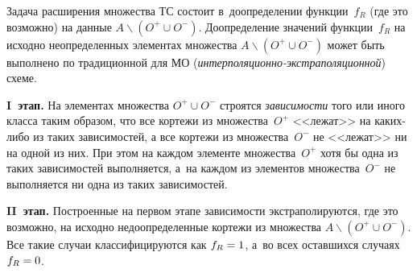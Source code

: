 \begin{multicols}{2}
  
 
  
  Задача расширения множества ТС состоит в~доопределении функции~$f_R$ 
(где это возможно) на данные $A\backslash (O^+\cup O^-)$. Доопределение 
значений функции~$f_R$ на исходно неопределенных элементах множества 
$A\backslash (O^+\cup O^-)$ может быть выполнено по традиционной для МО  
(\textit{ин\-тер\-по\-ля\-ци\-он\-но-экстра\-по\-ля\-ци\-он\-ной}) схеме.
  
  \textbf{I~этап.} На элементах множества $O^+\cup O^-$ 
строятся \textit{зависимости} того или иного класса таким образом, что все 
кортежи из множества~$O^+$ <<лежат>> на ка\-ких-ли\-бо из таких 
зависимостей, а все кортежи из множества~$O^-$ не <<лежат>> ни на одной из 
них. При этом на каждом элементе множества~$O^+$ хотя бы одна из таких 
зависимостей выполняется, а~на каж\-дом из элементов множества~$O^-$ не 
выполняется ни одна из таких зависимостей.
  
  \textbf{II~этап.} Построенные на первом этапе зависимости 
экстраполируются, где это возможно, на исходно недоопределенные кортежи из 
множества $A\backslash (O^+\cup O^-)$. Все такие случаи классифицируются 
как  $f_R\hm=1$, а~во всех оставшихся случаях  $f_R\hm=0$.
  

\end{multicols}
